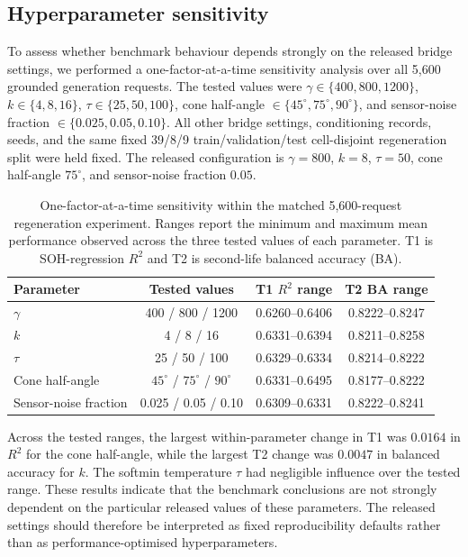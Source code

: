 \documentclass[11pt]{article}
\begin{document}
\subsection*{Hyperparameter sensitivity}

To assess whether benchmark behaviour depends strongly on the released bridge settings, we performed a one-factor-at-a-time sensitivity analysis over all 5,600 grounded generation requests. The tested values were
$\gamma\in\{400,800,1200\}$, $k\in\{4,8,16\}$,
$\tau\in\{25,50,100\}$, cone half-angle
$\in\{45^\circ,75^\circ,90^\circ\}$, and sensor-noise fraction
$\in\{0.025,0.05,0.10\}$. All other bridge settings, conditioning
records, seeds, and the same fixed 39/8/9 train/validation/test
cell-disjoint regeneration split were held fixed. The released configuration is
$\gamma=800$, $k=8$, $\tau=50$, cone half-angle $75^\circ$, and
sensor-noise fraction $0.05$.

\begin{table}[!htb]
\centering
\caption{One-factor-at-a-time sensitivity within the matched 5,600-request
regeneration experiment.
Ranges report the minimum and maximum mean performance observed across the
three tested values of each parameter. T1 is SOH-regression $R^2$ and T2 is
second-life balanced accuracy (BA).}
\label{tab:sensitivity}
\small
\begin{tabular}{@{}lccc@{}}
\toprule
Parameter & Tested values & T1 $R^2$ range & T2 BA range \\
\midrule
$\gamma$ & 400 / 800 / 1200
& 0.6260--0.6406 & 0.8222--0.8247 \\
$k$ & 4 / 8 / 16
& 0.6331--0.6394 & 0.8211--0.8258 \\
$\tau$ & 25 / 50 / 100
& 0.6329--0.6334 & 0.8214--0.8222 \\
Cone half-angle & $45^\circ$ / $75^\circ$ / $90^\circ$
& 0.6331--0.6495 & 0.8177--0.8222 \\
Sensor-noise fraction & 0.025 / 0.05 / 0.10
& 0.6309--0.6331 & 0.8222--0.8241 \\
\bottomrule
\end{tabular}
\end{table}

Across the tested ranges, the largest within-parameter change in T1 was
$0.0164$ in $R^2$ for the cone half-angle, while the largest T2 change was
$0.0047$ in balanced accuracy for $k$. The softmin temperature $\tau$ had
negligible influence over the tested range. These results indicate that the
benchmark conclusions are not strongly dependent on the particular released
values of these parameters. The released settings should therefore be
interpreted as fixed reproducibility defaults rather than as
performance-optimised hyperparameters.
\end{document}
